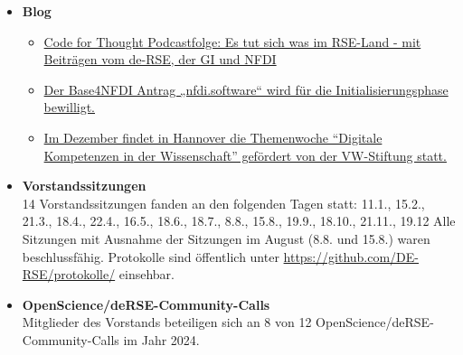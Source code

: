 \begin{itemize}
 \item[] \textbf{Blog}
 \begin{itemize}
  \item \href{https://de-rse.org/blog/2024/03/25/code-for-thought-im-rse-land.html}{Code for Thought Podcastfolge: Es tut sich was im RSE-Land - mit Beiträgen vom de-RSE, der GI und NFDI}
  \item \href{https://de-rse.org/blog/2024/07/10/nfdi-basisdienst-nfdi.software-wird-gefördert.html}{Der Base4NFDI Antrag „nfdi.software“ wird für die Initialisierungsphase bewilligt.}
  \item \href{https://de-rse.org/blog/2024/12/05/vw-symposium.html}{Im Dezember findet in Hannover die Themenwoche “Digitale Kompetenzen in der Wissenschaft” gefördert von der VW-Stiftung statt.}
 \end{itemize}
 \item[] \textbf{Vorstandssitzungen}\\
  14 Vorstandssitzungen fanden an den folgenden Tagen statt: 11.1., 15.2., 21.3., 18.4., 22.4., 16.5., 18.6., 18.7., 8.8., 15.8., 19.9., 18.10., 21.11., 19.12
  Alle Sitzungen mit Ausnahme der Sitzungen im August (8.8. und 15.8.) waren beschlussfähig.
  Protokolle sind öffentlich unter \href{https://github.com/DE-RSE/protokolle/}{https://github.com/DE-RSE/protokolle/} einsehbar.
 \item[] \textbf{OpenScience/deRSE-Community-Calls}\\
 Mitglieder des Vorstands beteiligen sich an 8 von 12 OpenScience/deRSE-Community-Calls im Jahr 2024.
\end{itemize}




